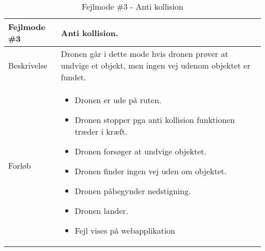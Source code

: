 \begin{table}[H]
\begin{tabular}{| p{3cm}| p{11.5cm}|}
\hline

Fejlmode \#3	 							& Anti kollision. \\\hline
Beskrivelse 									& Dronen går i dette mode hvis dronen prøver at undvige et objekt, men ingen vej udenom objektet er fundet. \\\hline
Forløb											& \begin{itemize}
															\item Dronen er ude på ruten.
															\item Dronen stopper pga anti kollision funktionen træder i kræft.
															\item Dronen forsøger at undvige objektet.
															\item Dronen finder ingen vej uden om objektet.
															\item Dronen påbegynder nedstigning.
															\item Dronen lander.
															\item Fejl vises på webapplikation
														\end{itemize} \\\hline 
\end{tabular}
\caption{Fejlmode \#3 - Anti kollision}
\label{tab:fejlmode3}
\end{table}